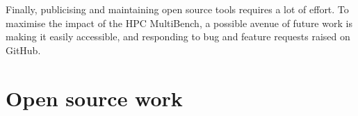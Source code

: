 Finally, publicising and maintaining open source tools requires a lot of effort. To maximise the impact of the HPC MultiBench, a possible avenue of future work is making it easily accessible, and responding to bug and feature requests raised on GitHub.


\section{Open source work}
\label{sec:open-source-work} %


